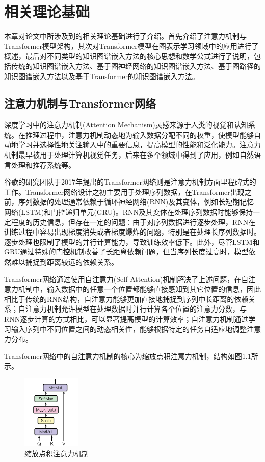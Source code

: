 \chapter{相关理论基础}
本章对论文中所涉及到的相关理论基础进行了介绍。首先介绍了注意力机制与Transformer模型架构，其次对Transformer模型在图表示学习领域中的应用进行了概述，最后对不同类型的知识图谱嵌入方法的核心思想和数学公式进行了说明，包括传统的知识图谱嵌入方法、基于图神经网络的知识图谱嵌入方法、基于图路径的知识图谱嵌入方法以及基于Transformer的知识图谱嵌入方法。

\section{注意力机制与Transformer网络}
深度学习中的注意力机制(Attention Mechanism)灵感来源于人类的视觉和认知系统。在推理过程中，注意力机制动态地为输入数据分配不同的权重，使模型能够自动地学习并选择性地关注输入中的重要信息，提高模型的性能和泛化能力。注意力机制最早被用于处理计算机视觉任务，后来在多个领域中得到了应用，例如自然语言处理和推荐系统等。

谷歌的研究团队于2017年提出的Transformer网络则是注意力机制方面里程碑式的工作。Transformer网络设计之初主要用于处理序列数据，在Transformer出现之前，序列数据的处理通常依赖于循环神经网络(RNN)及其变体，例如长短期记忆网络(LSTM)和门控递归单元(GRU)。RNN及其变体在处理序列数据时能够保持一定程度的历史信息，但存在一定的问题：由于对序列数据进行逐步处理，RNN在训练过程中容易出现梯度消失或者梯度爆炸的问题，特别是在处理长序列数据时。逐步处理也限制了模型的并行计算能力，导致训练效率低下。此外，尽管LSTM和GRU通过特殊的门控机制改善了长距离依赖问题，但当序列长度过高时，模型依然难以捕捉到距离较远的依赖关系。

Transformer网络通过使用自注意力(Self-Attention)机制解决了上述问题，在自注意力机制中，输入数据中的任意一个位置都能够直接感知到其它位置的信息，因此相比于传统的RNN结构，自注意力能够更加直接地捕捉到序列中长距离的依赖关系；自注意力机制允许模型在处理数据时并行计算各个位置的注意力分数，与RNN逐步计算的方式相比，可以显著提高模型的计算效率；自注意力机制通过学习输入序列中不同位置之间的动态相关性，能够根据特定的任务自适应地调整注意力分布。

Transformer网络中的自注意力机制的核心为缩放点积注意力机制，结构如图\ref{DotProductAttention}所示。
\begin{figure}[htbp]
  \vspace{-0.8cm}
  \centerline{\includegraphics[width=0.250\textwidth]{pic/DotProductAttention.png}}
  \caption{缩放点积注意力机制}
  \label{DotProductAttention}
\end{figure}

